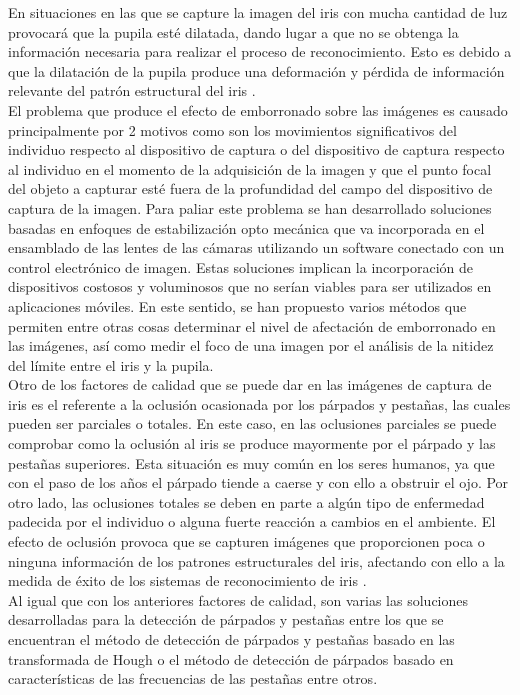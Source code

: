 En situaciones en las que se capture la imagen del iris con mucha cantidad de luz provocará que la pupila esté dilatada, dando lugar a que no se obtenga la información necesaria para realizar el proceso de reconocimiento. Esto es debido a que la dilatación de la pupila produce una deformación y pérdida de información relevante del patrón estructural del iris \cite{Reference9}.\\

El problema que produce el efecto de emborronado sobre las imágenes es causado principalmente por 2 motivos como son los movimientos significativos del individuo respecto al dispositivo de captura o del dispositivo de captura respecto al individuo en el momento de la adquisición de la imagen y que el punto focal del objeto a capturar esté fuera de la profundidad del campo del dispositivo de captura de la imagen. Para paliar este problema se han desarrollado soluciones basadas en enfoques de estabilización opto mecánica que va incorporada en el ensamblado de las lentes de las cámaras utilizando un software conectado con un control electrónico de imagen. Estas soluciones implican la incorporación de dispositivos costosos y voluminosos que no serían viables para ser utilizados en aplicaciones móviles. En este sentido, se han propuesto varios métodos que permiten entre otras cosas  determinar el nivel de afectación de emborronado  en las imágenes, así como medir el foco de una imagen por el análisis de la nitidez del límite entre el iris y la pupila. \\

Otro de los factores de calidad que se puede dar en las imágenes de captura de iris es el referente a la oclusión ocasionada por los párpados y pestañas, las cuales pueden ser parciales o totales. En este caso, en las oclusiones parciales se puede comprobar como la oclusión al iris se produce mayormente por el párpado y las pestañas superiores. Esta situación es muy común en los seres humanos, ya que con el paso de los años el párpado tiende a caerse y con ello a obstruir el ojo. Por otro lado, las oclusiones totales se deben en parte a algún tipo de enfermedad padecida por el individuo o alguna fuerte reacción a cambios en el ambiente. El efecto de oclusión provoca que se capturen imágenes que proporcionen poca o ninguna información de los patrones estructurales del iris, afectando con ello a la medida de éxito de los sistemas de reconocimiento de iris \cite{Reference9}.\\

Al igual que con los anteriores factores de calidad, son varias las soluciones desarrolladas para la detección de párpados y pestañas entre los que se encuentran el método de detección de párpados y pestañas basado en las transformada de Hough \cite{Reference10} o el método de detección de párpados basado en características de las frecuencias de las pestañas \cite{Reference11} entre otros. \\

